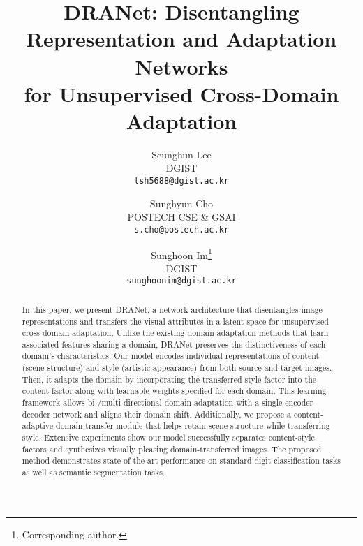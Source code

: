 \documentclass[final]{cvpr}
\begin{document}
\title{DRANet: Disentangling Representation and Adaptation Networks \\ for Unsupervised Cross-Domain Adaptation}

\author{Seunghun Lee\\
DGIST\\
{\tt\small lsh5688@dgist.ac.kr}
\and
Sunghyun Cho\\
POSTECH CSE \& GSAI\\
{\tt\small s.cho@postech.ac.kr}
\and
Sunghoon Im\thanks{Corresponding author.}\\
DGIST\\
{\tt\small sunghoonim@dgist.ac.kr}
}

\maketitle


\begin{abstract}
     In this paper, we present DRANet, a network architecture that disentangles image representations and transfers the visual attributes in a latent space for unsupervised cross-domain adaptation. Unlike the existing domain adaptation methods that learn associated features sharing a domain, DRANet preserves the distinctiveness of each domain's characteristics. Our model encodes individual representations of content (scene structure) and style (artistic appearance) from both source and target images. Then, it adapts the domain by incorporating the transferred style factor into the content factor along with learnable weights specified for each domain. This learning framework allows bi-/multi-directional domain adaptation with a single encoder-decoder network and aligns their domain shift. Additionally, we propose a content-adaptive domain transfer module that helps retain scene structure while transferring style. Extensive experiments show our model successfully separates content-style factors and synthesizes visually pleasing domain-transferred images. The proposed method demonstrates state-of-the-art performance on standard digit classification tasks as well as semantic segmentation tasks.
     








    
   





\end{abstract}
\end{document}

